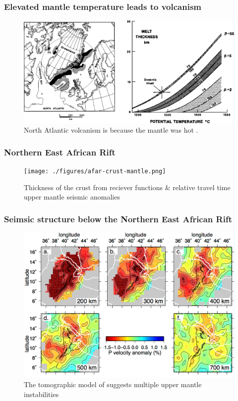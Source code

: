 \documentclass[aspectratio=169]{beamer}
\begin{document}
\begin{frame}
    \frametitle{Elevated mantle temperature leads to volcanism}
    \begin{figure}
        \includegraphics[height=0.6\paperheight]{./figures/mckenzie.png}
        \caption{North Atlantic volcanism is because the mantle was hot \citep{white-1995}.}
    \end{figure}
\end{frame}

\begin{frame}
    \frametitle{Northern East African Rift}
    \begin{figure}
        \texttt{[image: ./figures/afar-crust-mantle.png]}
        \caption{Thickness of the crust from reciever functions \& relative travel time upper mantle seismic anomalies}
    \end{figure}
\end{frame}

\begin{frame}
    \frametitle{Seimsic structure below the Northern East African Rift}
    \begin{figure}
        \vspace{-0.3cm}
        \includegraphics[height=0.7\paperheight]{./figures/civiero-2016.png}
        \caption{The tomographic model of \cite{civiero-etal-2016} suggests multiple upper mantle instabilities}
    \end{figure}
\end{frame}
\end{document}
